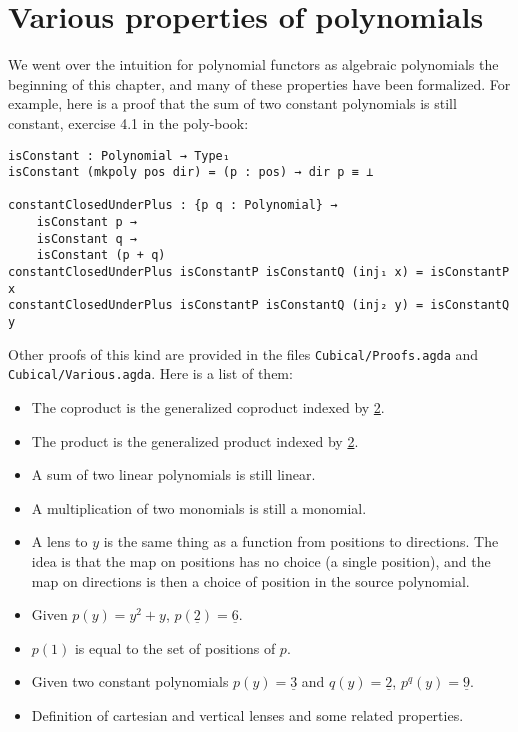 \section{Various properties of polynomials}

We went over the intuition for polynomial functors as algebraic polynomials the beginning of this chapter, and many of these properties have been formalized. For example, here is a proof that the sum of two constant polynomials is still constant, exercise 4.1 in the poly-book:

\begin{verbatim}
isConstant : Polynomial → Type₁
isConstant (mkpoly pos dir) = (p : pos) → dir p ≡ ⊥

constantClosedUnderPlus : {p q : Polynomial} → 
    isConstant p → 
    isConstant q → 
    isConstant (p + q)
constantClosedUnderPlus isConstantP isConstantQ (inj₁ x) = isConstantP x
constantClosedUnderPlus isConstantP isConstantQ (inj₂ y) = isConstantQ y
\end{verbatim}

Other proofs of this kind are provided in the files \texttt{Cubical/Proofs.agda} and 
\texttt{Cubical/Various.agda}. Here is a list of them:
\begin{itemize}
    \item The coproduct is the generalized coproduct indexed by \underline{2}.
    \item The product is the generalized product indexed by \underline{2}.
    \item A sum of two linear polynomials is still linear.
    \item A multiplication of two monomials is still a monomial.
    \item A lens to $y$ is the same thing as a function from positions to directions. The idea is that the map on positions has no choice (a single position), and the map on directions is then a choice of position in the source polynomial.
    \item Given $p(y) = y^2 + y$, $p(\underline{2}) = \underline{6}$.
    \item $p(1)$ is equal to the set of positions of $p$.
    \item Given two constant polynomials $p(y) = \underline{3}$ and $q(y) = \underline{2}$, $p^q(y) = \underline{9}$.
    \item Definition of cartesian and vertical lenses and some related properties.
\end{itemize}
